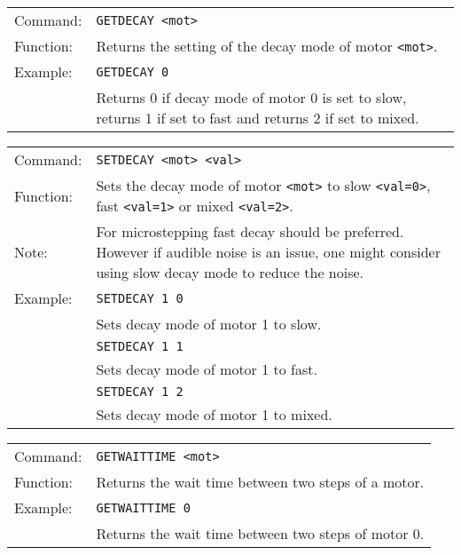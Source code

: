 \begin{table}[h]
  \begin{tabularx}{\textwidth}{lX}
    Command:  & \texttt{GETDECAY <mot>}\\
    Function: & Returns the setting of the decay mode of motor \texttt{<mot>}.\\
    Example:  & \texttt{GETDECAY 0}\\
              & Returns 0 if decay mode of motor 0 is set to slow, returns 1 if set to fast and returns 2 if set to mixed.
  \end{tabularx}
\end{table}

\vspace{\vdistace}

\begin{table}[h]
  \begin{tabularx}{\textwidth}{lX}
    Command:  & \texttt{SETDECAY <mot> <val>}\\
    Function: & Sets the decay mode of motor \texttt{<mot>} to slow \texttt{<val=0>}, fast \texttt{<val=1>} or mixed \texttt{<val=2>}.\\
    Note:     & For microstepping fast decay should be preferred. However if audible noise is an issue, one might consider using slow decay mode to reduce the noise.\\
    Example:  & \texttt{SETDECAY 1 0}\\
              & Sets decay mode of motor 1 to slow.\\
              & \texttt{SETDECAY 1 1}\\
              & Sets decay mode of motor 1 to fast.\\
              & \texttt{SETDECAY 1 2}\\
              & Sets decay mode of motor 1 to mixed.
  \end{tabularx}
\end{table}

\vspace{\vdistace}

\begin{table}[h]
  \begin{tabularx}{\textwidth}{lX}
    Command:  & \texttt{GETWAITTIME <mot>}\\
    Function: & Returns the wait time between two steps of a motor.\\
    Example:  & \texttt{GETWAITTIME 0}\\
              & Returns the wait time between two steps of motor 0.
  \end{tabularx}
\end{table}


